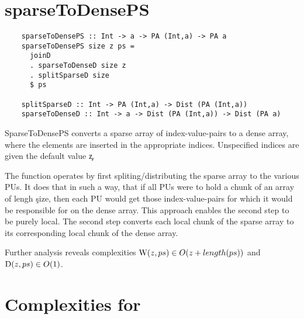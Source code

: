 
\section{sparseToDensePS}
  \begin{lstlisting}
    sparseToDensePS :: Int -> a -> PA (Int,a) -> PA a
    sparseToDensePS size z ps = 
      joinD
      . sparseToDenseD size z
      . splitSparseD size
      $ ps

    splitSparseD :: Int -> PA (Int,a) -> Dist (PA (Int,a))
    sparseToDenseD :: Int -> a -> Dist (PA (Int,a)) -> Dist (PA a)
  \end{lstlisting}
  SparseToDensePS converts a sparse array of index-value-pairs
  to a dense array, where the elements are inserted in the appropriate
  indices. Unspecified indices are given the default value \c{z}.

  The function operates by first spliting/distributing the sparse array
  to the various PUs. It does that in such a way, that if all PUs were to
  hold a chunk of an array of lengh \c{size}, then each PU would get
  those index-value-pairs for which it would be responsible for on the
  dense array. This approach enables the second step to be purely local.
  The second step converts each local chunk of the sparse array to its corresponding
  local chunk of the dense array.

  Further analysis reveals complexities $\textrm{W}(z,ps) \in O(z + length(ps))$
  and $\textrm{D}(z,ps) \in O(1)$.
  
\section{Complexities for \ndpv}  
      
